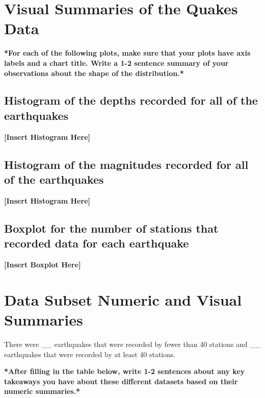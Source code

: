 \documentclass[12pt]{article}
\begin{document}
\newpage
\section*{Visual Summaries of the Quakes Data}
\textbf{*For each of the following plots, make sure that your plots have axis labels and a chart title. Write a 1-2 sentence summary of your observations about the shape of the distribution.*}

\subsection*{Histogram of the depths recorded for all of the earthquakes}
\textbf{[Insert Histogram Here]}

\subsection*{Histogram of the magnitudes recorded for all of the earthquakes}
\textbf{[Insert Histogram Here]}

\subsection*{Boxplot for the number of stations that recorded data for each earthquake}
\textbf{[Insert Boxplot Here]}

\section*{Data Subset Numeric and Visual Summaries}
There were \_\_ earthquakes that were recorded by fewer than 40 stations and \_\_ earthquakes that were recorded by at least 40 stations.

\textbf{*After filling in the table below, write 1-2 sentences about any key takeaways you have about these different datasets based on their numeric summaries.*}
\begin{table}[h]
    \centering
    \caption{Summary Statistics for Different Data Subsets}
\end{table}
\end{document}
